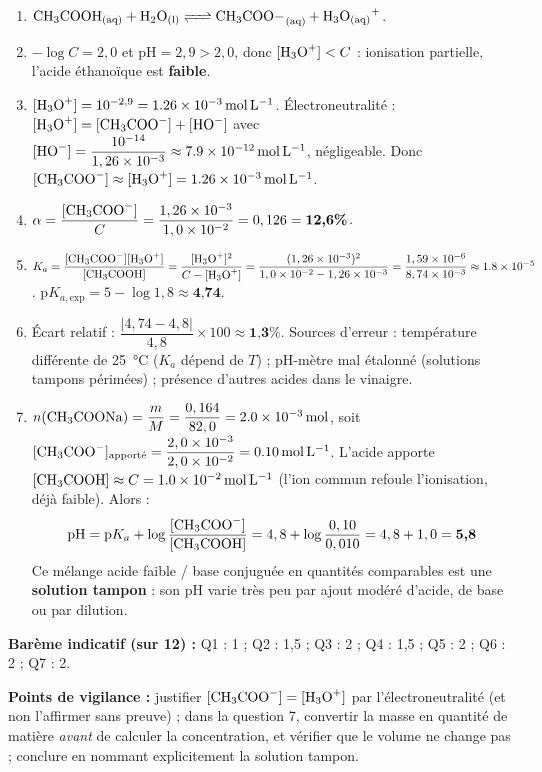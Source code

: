 \documentclass[11pt]{article}
\begin{document}
\begin{corrige}
\begin{enumerate}
\item $\ce{CH3COOH_{(aq)} + H2O_{(l)} <=> CH3COO-_{(aq)} + H3O+_{(aq)}}$.
\item $-\log C = 2,0$ et $\mathrm{pH} = 2,9 > 2,0$, donc $[\ce{H3O+}] < C$ : ionisation partielle, l'acide éthanoïque est \textbf{faible}.
\item $[\ce{H3O+}] = 10^{-2,9} = \SI{1,26e-3}{mol.L^{-1}}$. Électroneutralité : $[\ce{H3O+}] = [\ce{CH3COO-}] + [\ce{HO-}]$ avec $[\ce{HO-}] = \dfrac{10^{-14}}{1,26\times 10^{-3}} \approx \SI{7,9e-12}{mol.L^{-1}}$, négligeable. Donc $[\ce{CH3COO-}] \approx [\ce{H3O+}] = \SI{1,26e-3}{mol.L^{-1}}$.
\item $\alpha = \dfrac{[\ce{CH3COO-}]}{C} = \dfrac{1,26\times 10^{-3}}{1,0\times 10^{-2}} = 0,126 = \textbf{12,6\%}$.
\item $K_a = \dfrac{[\ce{CH3COO-}][\ce{H3O+}]}{[\ce{CH3COOH}]} = \dfrac{[\ce{H3O+}]^2}{C - [\ce{H3O+}]} = \dfrac{(1,26\times 10^{-3})^2}{1,0\times 10^{-2} - 1,26\times 10^{-3}} = \dfrac{1,59\times 10^{-6}}{8,74\times 10^{-3}} \approx \SI{1,8e-5}{}$. $\mathrm{p}K_{a,\mathrm{exp}} = 5 - \log 1,8 \approx \textbf{4,74}$.
\item Écart relatif : $\dfrac{|4,74 - 4,8|}{4,8}\times 100 \approx \textbf{1,3\%}$. Sources d'erreur : température différente de \SI{25}{\celsius} ($K_a$ dépend de $T$) ; pH-mètre mal étalonné (solutions tampons périmées) ; présence d'autres acides dans le vinaigre.
\item $n(\ce{CH3COONa}) = \dfrac{m}{M} = \dfrac{0,164}{82,0} = \SI{2,0e-3}{mol}$, soit $[\ce{CH3COO-}]_{\text{apporté}} = \dfrac{2,0\times 10^{-3}}{2,0\times 10^{-2}} = \SI{0,10}{mol.L^{-1}}$. L'acide apporte $[\ce{CH3COOH}] \approx C = \SI{1,0e-2}{mol.L^{-1}}$ (l'ion commun  refoule l'ionisation, déjà faible). Alors :
\[ \mathrm{pH} = \mathrm{p}K_a + \log\frac{[\ce{CH3COO-}]}{[\ce{CH3COOH}]} = 4,8 + \log\frac{0,10}{0,010} = 4,8 + 1,0 = \textbf{5,8} \]
Ce mélange acide faible / base conjuguée en quantités comparables est une \textbf{solution tampon} : son pH varie très peu par ajout modéré d'acide, de base ou par dilution.
\end{enumerate}
\textbf{Barème indicatif (sur 12) :} Q1 : 1 ; Q2 : 1,5 ; Q3 : 2 ; Q4 : 1,5 ; Q5 : 2 ; Q6 : 2 ; Q7 : 2.\par
\textbf{Points de vigilance :} justifier $[\ce{CH3COO-}] = [\ce{H3O+}]$ par l'électroneutralité (et non l'affirmer sans preuve) ; dans la question 7, convertir la masse en quantité de matière \emph{avant} de calculer la concentration, et vérifier que le volume ne change pas ; conclure en nommant explicitement la solution tampon.
\end{corrige}
\end{document}
